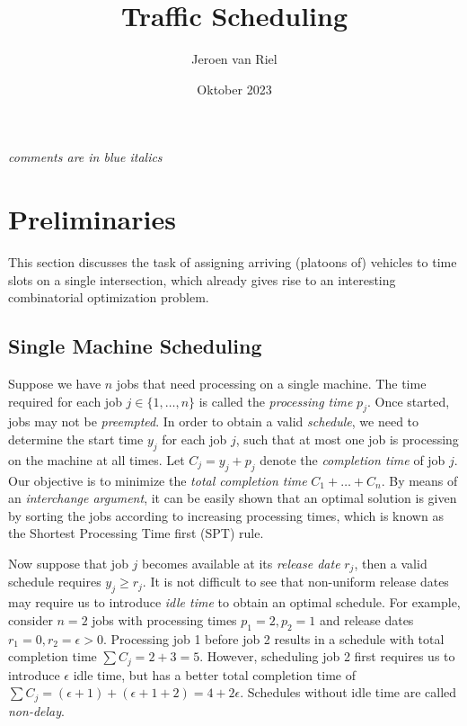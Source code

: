 \documentclass{article}
\title{Traffic Scheduling}
\author{Jeroen van Riel}
\date{Oktober 2023}
\theoremstyle{definition}
\begin{document}
\maketitle

\noindent
\textit{\color{blue}comments are in blue italics}

\section{Preliminaries}

This section discusses the task of assigning arriving (platoons of) vehicles to
time slots on a single intersection, which already gives rise to an interesting
combinatorial optimization problem.

\subsection{Single Machine Scheduling}

Suppose we have $n$ jobs that need processing on a single machine. The time
required for each job $j \in \{1, \dots, n\}$ is called the \textit{processing
  time} $p_{j}$. Once started, jobs may not be \textit{preempted}. In order to
obtain a valid \textit{schedule}, we need to determine the start time $y_{j}$
for each job $j$, such that at most one job is processing on the machine at all
times. Let $C_{j} = y_{j} + p_{j}$ denote the \textit{completion time} of job
$j$. Our objective is to minimize the \textit{total completion time}
$C_{1} + \dots + C_{n}$. By means of an \textit{interchange argument}, it can be
easily shown that an optimal solution is given by sorting the jobs according to
increasing processing times, which is known as the Shortest Processing Time
first (SPT) rule.

Now suppose that job $j$ becomes available at its \textit{release date} $r_{j}$,
then a valid schedule requires $y_{j} \geq r_{j}$. It is not difficult to see
that non-uniform release dates may require us to introduce \textit{idle time} to
obtain an optimal schedule. For example, consider $n=2$ jobs with processing
times $p_{1}=2, p_{2}=1$ and release dates $r_{1}=0, r_{2}=\epsilon > 0$.
Processing job 1 before job 2 results in a schedule with total completion time
$\sum C_{j} = 2 + 3 = 5$. However, scheduling job 2 first requires us to
introduce $\epsilon$ idle time, but has a better total completion time of
$\sum C_{j} = (\epsilon + 1) + (\epsilon + 1 + 2) = 4 + 2 \epsilon$. Schedules
without idle time are called \textit{non-delay}.
\end{document}
